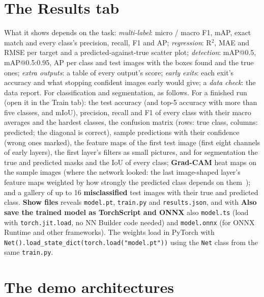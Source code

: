 \documentclass[11pt,a4paper]{article}
\newcommand{\ui}[1]{\textbf{\textsf{#1}}}
\newcommand{\file}[1]{\texttt{#1}}
\begin{document}
\section{The Results tab}
What it shows depends on the task: \emph{multi-label}: micro / macro F1, mAP, exact match and every class's precision, recall, F1 and
AP; \emph{regression}: R$^2$, MAE and RMSE per target and a predicted-against-true scatter plot; \emph{detection}: mAP@0.5,
mAP@0.5:0.95, AP per class and test images with the boxes found and the true ones; \emph{extra outputs}: a table of every output's
score; \emph{early exits}: each exit's accuracy and what stopping confident images early would give; a \emph{data check}: the data
report. For classification and segmentation, as follows. For a finished run (open it in the Train tab): the test accuracy (and top-5 accuracy with more than five classes, and mIoU), precision,
recall and F1 of every class with their macro averages and the hardest classes, the confusion matrix (rows: true class, columns: predicted;
the diagonal is correct), sample predictions with their confidence (wrong ones marked), the feature maps of the first test image (first
eight channels of early layers), the first layer's filters as small pictures, and for segmentation the true and predicted masks and the IoU
of every class; \textbf{Grad-CAM} heat maps on the sample images (where the network looked: the last image-shaped layer's feature maps
weighted by how strongly the predicted class depends on them~\cite{selvaraju2016gradcam}); and a gallery of up to 16
\textbf{misclassified} test images with their true and predicted class. \ui{Show files} reveals \file{model.pt}, \file{train.py} and
\file{results.json}, and with \ui{Also save the trained model as TorchScript and ONNX} also \file{model.ts} (load with
\texttt{torch.jit.load}, no NN Builder code needed) and \file{model.onnx} (for ONNX Runtime and other frameworks). The weights load in PyTorch with
\texttt{Net().load\_state\_dict(torch.load("model.pt"))} using the \texttt{Net} class from the same \file{train.py}.

\section{The demo architectures}
\label{sec:demos}
\end{document}
